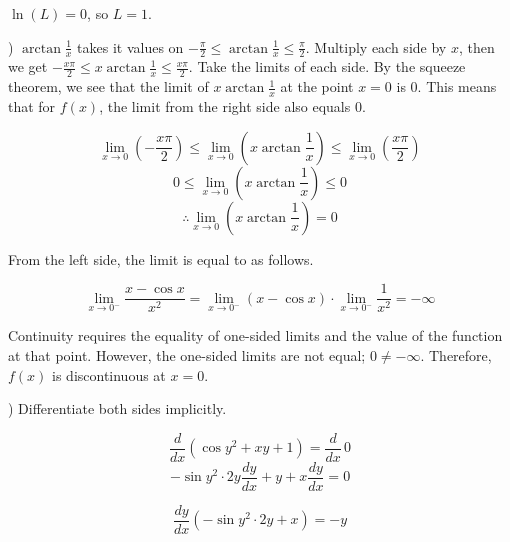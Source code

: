 \documentclass{article}
\begin{document}
\hfill

\noindent $\ln(L)= 0$, so $\boxed{L = 1}$.

\hfill

) $\displaystyle \arctan\frac1x$ takes it values on $\displaystyle -\frac{\pi}2 \leq \arctan\frac1x \leq \frac{\pi}2$. Multiply each side by $x$, then we get $\displaystyle -\frac{x\pi}2 \leq x\arctan\frac1x \leq \frac{x\pi}2$. Take the limits of each side. By the squeeze theorem, we see that the limit of $\displaystyle x\arctan\frac1x$ at the point $x=0$ is $0$. This means that for $f(x)$, the limit from the right side also equals $0$.

\begin{equation*}\lim_{x\to 0}\left(-\frac{x\pi}2\right)\leq\lim_{x\to 0}\left(x\arctan\frac1x\right)\leq\lim_{x\to 0}\left(\frac{x\pi}2\right)\end{equation*}
\begin{equation*}0\leq\lim_{x\to 0}\left(x\arctan\frac1x\right)\leq0\end{equation*}
\begin{equation*}\therefore\lim_{x\to 0}\left(x\arctan\frac1x\right) = 0\end{equation*}

\hfill

\noindent From the left side, the limit is equal to as follows.

\begin{equation*}\lim_{x\to0^-}\frac{x-\cos x}{x^2}=\lim_{x\to0^-}(x-\cos x)\cdot\lim_{x\to0^-}\frac1{x^2} =-\infty\end{equation*}

\hfill

\noindent Continuity requires the equality of one-sided limits and the value of the function at that point. However, the one-sided limits are not equal; $0\neq-\infty$. Therefore, $f(x)$ is discontinuous at $x=0$.

\hfill

) Differentiate both sides implicitly.

\begin{equation*}\frac{d}{dx}\left(\cos y^2 + xy +1 \right) = \frac{d}{dx} \, 0\end{equation*}
\begin{equation*}-\sin y^2 \cdot 2y\frac{dy}{dx} + y + x\frac{dy}{dx}= 0\end{equation*}

\begin{equation*}\frac{dy}{dx}\left(-\sin y^2 \cdot 2y + x\right)= -y\end{equation*}
\end{document}

